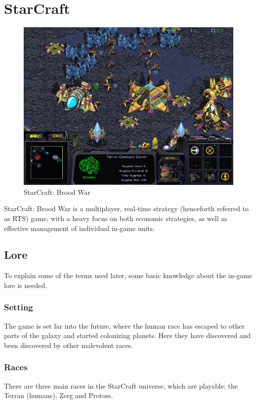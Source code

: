 
\section{StarCraft}
\label{sec:starcrafttheory}
\begin{figure}[h!tb]
\centering
\includegraphics[scale=0.5]{graphics/scbw.jpg}
\caption{StarCraft: Brood War}
\label{fig:scbwIntro}
\end{figure}


StarCraft: Brood War is a multiplayer, real-time strategy (henceforth referred to as RTS) game, with a heavy focus on both economic strategies, as well as effective management of individual in-game units.

\subsection{Lore}
To explain some of the terms used later, some basic knowledge about the in-game lore is needed.

\subsubsection{Setting}
The game is set far into the future, where the human race has escaped to other parts of the galaxy and started colonizing planets. Here they have discovered and been discovered by other malevolent races.
\subsubsection{Races}
There are three main races in the StarCraft universe, which are playable; the Terran (humans), Zerg and Protoss.
